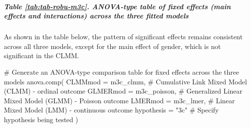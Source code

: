 \documentclass[
  bookmarksnumbered]{article}
\newenvironment{Shaded}{\begin{snugshade}}{\end{snugshade}}
\newcommand{\AttributeTok}[1]{\textcolor[rgb]{0.80,0.80,0.80}{#1}}
\newcommand{\CommentTok}[1]{\textcolor[rgb]{0.50,0.62,0.50}{#1}}
\newcommand{\FunctionTok}[1]{\textcolor[rgb]{0.94,0.94,0.56}{#1}}
\newcommand{\NormalTok}[1]{\textcolor[rgb]{0.80,0.80,0.80}{#1}}
\newcommand{\StringTok}[1]{\textcolor[rgb]{0.80,0.58,0.58}{#1}}
\begin{document}
\subparagraph{Table \ref{tab:tab-robu-m3c}. ANOVA-type table of fixed effects (main effects and interactions) across the three fitted models}\label{table-reftabtab-robu-m3c.-anova-type-table-of-fixed-effects-main-effects-and-interactions-across-the-three-fitted-models}

As shown in the table below, the pattern of significant effects remains consistent across all three models, except for the main effect of gender, which is not significant in the CLMM.

\begin{Shaded}
\begin{Highlighting}[]
\CommentTok{\# Generate an ANOVA{-}type comparison table for fixed effects across the three models}
\FunctionTok{anova.comp}\NormalTok{(}
  \AttributeTok{CLMMmod =}\NormalTok{ m3c\_clmm, }\CommentTok{\# Cumulative Link Mixed Model (CLMM) {-} ordinal outcome}
  \AttributeTok{GLMERmod =}\NormalTok{ m3c\_poisson, }\CommentTok{\# Generalized Linear Mixed Model (GLMM) {-} Poisson outcome}
  \AttributeTok{LMERmod =}\NormalTok{ m3c\_lmer, }\CommentTok{\# Linear Mixed Model (LMM) {-} continuous outcome}
  \AttributeTok{hypothesis =} \StringTok{"3c"} \CommentTok{\# Specify hypothesis being tested}
\NormalTok{)}
\end{Highlighting}
\end{Shaded}
\end{document}
